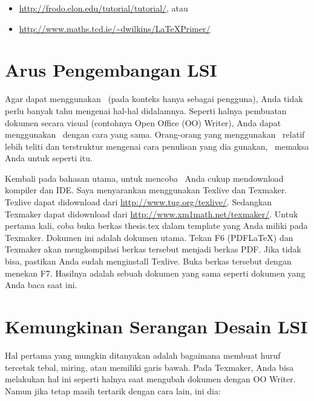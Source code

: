 \begin{itemize}
	\item \url{http://frodo.elon.edu/tutorial/tutorial/}, atau \item \url{http://www.maths.tcd.ie/~dwilkins/LaTeXPrimer/}
\end{itemize}

\section{Arus Pengembangan LSI}

Agar dapat menggunakan \latex~(pada konteks hanya sebagai pengguna), Anda tidak perlu banyak tahu mengenai hal-hal didalamnya. 
Seperti halnya pembuatan dokumen secara visual (contohnya Open Office (OO) Writer), Anda dapat menggunakan \latex~dengan cara yang sama. 
Orang-orang yang menggunakan \latex~relatif lebih teliti dan terstruktur mengenai cara penulisan yang dia gunakan, \latex~memaksa Anda untuk seperti itu.

Kembali pada bahasan utama, untuk mencoba \latex~Anda cukup mendownload kompiler dan IDE. Saya menyarankan menggunakan Texlive dan Texmaker. Texlive dapat didownload dari \url{http://www.tug.org/texlive/}. 
Sedangkan Texmaker dapat didownload dari 
\url{http://www.xm1math.net/texmaker/}. 
Untuk pertama kali, coba buka berkas thesis.tex dalam template yang Anda miliki pada Texmaker. Dokumen ini adalah dokumen utama. 
Tekan F6 (PDFLaTeX) dan Texmaker akan mengkompilasi berkas tersebut menjadi berkas PDF. Jika tidak bisa, pastikan Anda sudah menginstall Texlive. Buka berkas tersebut dengan menekan F7. Hasilnya adalah sebuah dokumen yang sama seperti dokumen yang Anda baca saat ini. 

\section{Kemungkinan Serangan Desain LSI}

Hal pertama yang mungkin ditanyakan adalah bagaimana membuat huruf tercetak tebal, miring, atau memiliki garis bawah. 
Pada Texmaker, Anda bisa melakukan hal ini seperti halnya saat mengubah dokumen dengan OO Writer. Namun jika tetap masih tertarik dengan cara lain, ini dia: 

